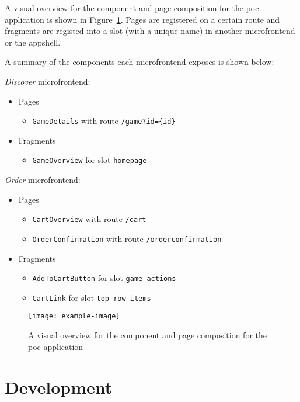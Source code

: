 A visual overview for the component and page composition for the \gls{poc}
application is shown in Figure~\ref{fig:poc-components}. Pages are registered on
a certain route and fragments are registed into a slot (with a unique name) in
another \gls{microfrontend} or the \gls{appshell}.

A summary of the components each \gls{microfrontend} exposes is shown below:
\begin{framed}
  \textit{Discover}  \gls{microfrontend}:
    \begin{itemize}
      \item[] Pages
      \begin{itemize}
        \item \texttt{GameDetails} with route \texttt{/game?id=\{id\}}
      \end{itemize}
      \item[] Fragments
      \begin{itemize}
        \item \texttt{GameOverview} for slot \texttt{homepage}
      \end{itemize}
    \end{itemize}
  \textit{Order} \gls{microfrontend}:
    \begin{itemize}
      \item[] Pages
      \begin{itemize}
        \item \texttt{CartOverview} with route \texttt{/cart}
        \item \texttt{OrderConfirmation} with route \texttt{/orderconfirmation}
      \end{itemize}
      \item[] Fragments
      \begin{itemize}
        \item \texttt{AddToCartButton} for slot \texttt{game-actions}
        \item \texttt{CartLink} for slot \texttt{top-row-items}
      \end{itemize}
    \end{itemize}
\end{framed} 


\begin{figure}
  \centering
  \texttt{[image: example-image]}  %
  \caption[Architecture overview for proof-of-concept solution]{A visual
  overview for the component and page composition for the \gls{poc}
  application}
  \label{fig:poc-components}
\end{figure}




\section{Development}
\label{sec:poc-development}

